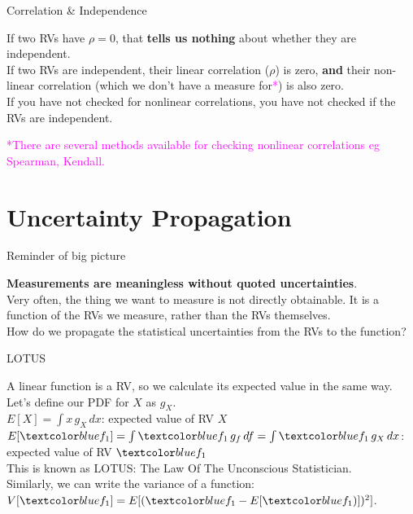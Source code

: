 \documentclass[10pt,sans,english,compress,xcolor=dvipsnames]{beamer}
\begin{document}
\begin{frame}{Correlation \& Independence}

If two RVs have $\rho=0$, that \textbf{tells us nothing} about whether they are independent.\\[1ex]

If two RVs are independent, their linear correlation ($\rho$) is zero, \textbf{and} their non-linear correlation (which we don't have a measure for\textcolor{magenta}{*}) is also zero.\\[1ex]

If you have not checked for nonlinear correlations, you have not checked if the RVs are independent.\\[1ex]

\footnotesize

\textcolor{magenta}{*There are several methods available for checking nonlinear correlations eg Spearman, Kendall.}
\end{frame} 


\section{Uncertainty Propagation}

\begin{frame}{Reminder of big picture}

\textbf{Measurements are meaningless without quoted uncertainties}. \\[1ex]

Very often, the thing we want to measure is not directly obtainable. It is a function of the RVs we measure, rather than the RVs themselves. \\[1ex]

How do we propagate the statistical uncertainties from the RVs to the function? \\[1ex]

\end{frame} 


\begin{frame}{LOTUS}
\footnotesize

A linear function  is a RV, so we calculate its expected value in the same way.\\[1ex]

Let's define our PDF for $X$ as $g_X$.\\[1ex]

$E[ X ] = \int x\, g_X\, dx $: expected value of RV $X$\\[1ex]

$E[ \bbl{f_1} ] = \int \bbl{f_1}\, g_f\, df = \int \bbl{f_1}\, g_X\,dx $: expected value of RV $\bbl{f_1}$\\[1ex]

This is known as LOTUS: The Law Of The Unconscious Statistician.\\[1ex]

Similarly, we can write the variance of a function: $V[ \bbl{f_1} ] = E[  ( \bbl{f_1} - E[ \bbl{f_1}) ] )^2 ]$.
\end{frame} 
\end{document}

